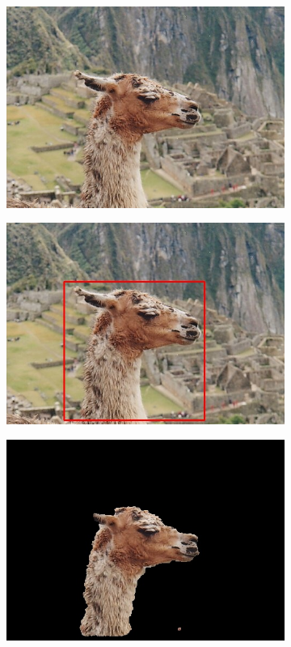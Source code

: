 \documentclass[a4paper,11]{article}
\begin{document}
\begin{center}
\begin{figure}[H]
   \begin{subfigure}{0.33\textwidth}
      \centering
      \includegraphics[width=0.9\linewidth]{images/llama}
    \end{subfigure}
    \begin{subfigure}{.33\textwidth}
      \centering
      \includegraphics[width=0.9\linewidth]{results/input/llama}
    \end{subfigure}
    \begin{subfigure}{0.33\textwidth}
      \centering
      \includegraphics[width=0.9\linewidth]{results/llama}
   \end{subfigure}\\
    \vspace{1em}
    

\end{figure}
\end{center}
\end{document}
